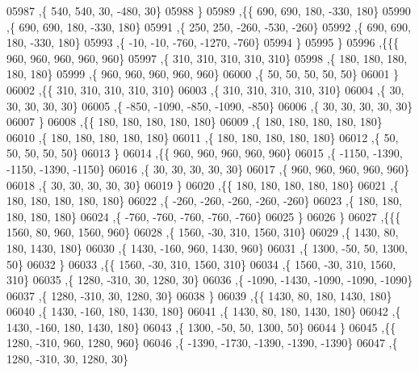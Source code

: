 \begin{DoxyCode}
05987     ,\{   540,   540,    30,  -480,    30\}
05988     \}
05989    ,\{\{   690,   690,   180,  -330,   180\}
05990     ,\{   690,   690,   180,  -330,   180\}
05991     ,\{   250,   250,  -260,  -530,  -260\}
05992     ,\{   690,   690,   180,  -330,   180\}
05993     ,\{   -10,   -10,  -760, -1270,  -760\}
05994     \}
05995    \}
05996   ,\{\{\{   960,   960,   960,   960,   960\}
05997     ,\{   310,   310,   310,   310,   310\}
05998     ,\{   180,   180,   180,   180,   180\}
05999     ,\{   960,   960,   960,   960,   960\}
06000     ,\{    50,    50,    50,    50,    50\}
06001     \}
06002    ,\{\{   310,   310,   310,   310,   310\}
06003     ,\{   310,   310,   310,   310,   310\}
06004     ,\{    30,    30,    30,    30,    30\}
06005     ,\{  -850, -1090,  -850, -1090,  -850\}
06006     ,\{    30,    30,    30,    30,    30\}
06007     \}
06008    ,\{\{   180,   180,   180,   180,   180\}
06009     ,\{   180,   180,   180,   180,   180\}
06010     ,\{   180,   180,   180,   180,   180\}
06011     ,\{   180,   180,   180,   180,   180\}
06012     ,\{    50,    50,    50,    50,    50\}
06013     \}
06014    ,\{\{   960,   960,   960,   960,   960\}
06015     ,\{ -1150, -1390, -1150, -1390, -1150\}
06016     ,\{    30,    30,    30,    30,    30\}
06017     ,\{   960,   960,   960,   960,   960\}
06018     ,\{    30,    30,    30,    30,    30\}
06019     \}
06020    ,\{\{   180,   180,   180,   180,   180\}
06021     ,\{   180,   180,   180,   180,   180\}
06022     ,\{  -260,  -260,  -260,  -260,  -260\}
06023     ,\{   180,   180,   180,   180,   180\}
06024     ,\{  -760,  -760,  -760,  -760,  -760\}
06025     \}
06026    \}
06027   ,\{\{\{  1560,    80,   960,  1560,   960\}
06028     ,\{  1560,   -30,   310,  1560,   310\}
06029     ,\{  1430,    80,   180,  1430,   180\}
06030     ,\{  1430,  -160,   960,  1430,   960\}
06031     ,\{  1300,   -50,    50,  1300,    50\}
06032     \}
06033    ,\{\{  1560,   -30,   310,  1560,   310\}
06034     ,\{  1560,   -30,   310,  1560,   310\}
06035     ,\{  1280,  -310,    30,  1280,    30\}
06036     ,\{ -1090, -1430, -1090, -1090, -1090\}
06037     ,\{  1280,  -310,    30,  1280,    30\}
06038     \}
06039    ,\{\{  1430,    80,   180,  1430,   180\}
06040     ,\{  1430,  -160,   180,  1430,   180\}
06041     ,\{  1430,    80,   180,  1430,   180\}
06042     ,\{  1430,  -160,   180,  1430,   180\}
06043     ,\{  1300,   -50,    50,  1300,    50\}
06044     \}
06045    ,\{\{  1280,  -310,   960,  1280,   960\}
06046     ,\{ -1390, -1730, -1390, -1390, -1390\}
06047     ,\{  1280,  -310,    30,  1280,    30\}

\end{DoxyCode}
